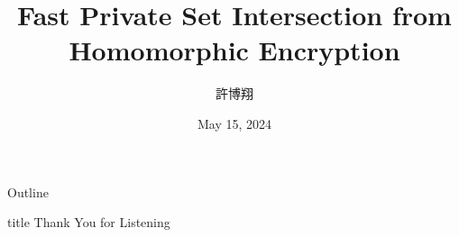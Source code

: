 \title{Fast Private Set Intersection from Homomorphic Encryption}
\author{許博翔}
\institute{}
\date{May 15, 2024}


\frame{\titlepage}
\begin{frame}{Outline}
\tableofcontents
\end{frame}




\begin{frame}
  \vfill
  \centering
  \begin{beamercolorbox}[sep=8pt,center,shadow=true,rounded=true]{title}
    Thank You for Listening\par
  \end{beamercolorbox}
  \vfill
  \end{frame}



